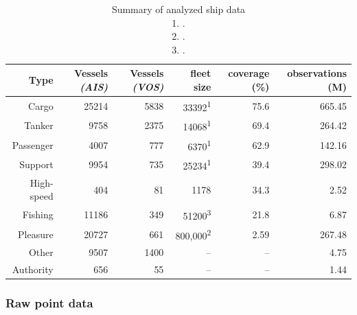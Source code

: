 \documentclass[12pt,letterpaper]{article}
\begin{document}

\begin{table}[htbp]
  \begin{tabular}{rrrrrr} %
    \hline
    Type & Vessels \textit{(AIS)} & Vessels \textit{(VOS)} & fleet size & coverage (\%) & observations (M) \\
    \hline
    Cargo & 25214 & 5838 & 33392\textsuperscript{1} & 75.6 & 665.45 \\
    Tanker & 9758 & 2375 & 14068\textsuperscript{1} & 69.4 & 264.42 \\
    Passenger & 4007 & 777 & 6370\textsuperscript{1} & 62.9 & 142.16 \\
    Support & 9954 & 735 & 25234\textsuperscript{1} & 39.4 & 298.02 \\
    High-speed & 404 & 81 & 1178 & 34.3 & 2.52 \\
    Fishing & 11186 & 349 & 51200\textsuperscript{3} & 21.8 & 6.87 \\
    Pleasure & 20727 & 661 & 800,000\textsuperscript{2} & 2.59 & 267.48 \\
    Other & 9507 & 1400 & -- & -- & 4.75 \\
    Authority & 656 & 55 & -- & -- & 1.44 \\
  \end{tabular}
  \caption{Summary of analyzed ship data\\
  1. \cite{Equasis2011}.\\
  2. \cite{westwood2001global}.\\
  3. \cite{FAOfishing}.}
  \label{table:ships-by-type}
\end{table}


\subsubsection{Raw point data}

\end{document}
